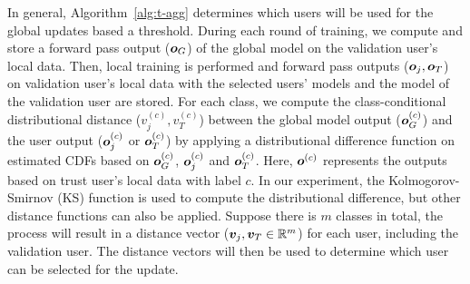 \documentclass{article} %
\newcommand{\yli}[1]{{\color{cyan}#1}}
\begin{document}
\yli{In general, Algorithm~\ref{alg:t-agg} determines which users will be used for the global updates based a threshold. During each round of training, we compute and store a forward pass output (${\bm{o}}_G$) of the global model on the validation user's local data. Then, local training is performed and forward pass outputs (${\bm{o}}_j, {\bm{o}}_T$) on validation user's local data with the selected users' models and the model of the validation user are stored. For each class, we compute the class-conditional distributional distance ($v^{(c)}_j, v^{(c)}_T$) between the global model output (${\bm{o}}^{(c)}_G$) and the user output (${\bm{o}}^{(c)}_j$ or ${\bm{o}}^{(c)}_T$) by applying a distributional difference function on estimated CDFs based on ${\bm{o}}^{(c)}_G$, ${\bm{o}}^{(c)}_j$ and ${\bm{o}}^{(c)}_T$. Here, ${\bm{o}}^{(c)}$ represents the outputs based on trust user's local data with label $c$. In our experiment, the Kolmogorov-Smirnov (KS) function is used to compute the distributional difference, but other distance functions can also be applied. Suppose there is $m$ classes in total, the process will result in a distance vector (${\bm{v}}_j, {\bm{v}}_T\in{\mathbb{R}}^m$) for each user, including the validation user. The distance vectors will then be used to determine which user can be selected for the update.}

%

\vspace{-10pt}
\end{document}
